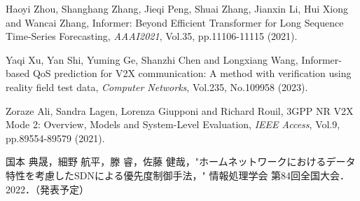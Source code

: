 \documentclass[a4paper,11pt,uplatex]{ujreport}
\begin{document}
\begin{thebibliography}{99}
  Haoyi Zhou, Shanghang Zhang, Jieqi Peng, Shuai Zhang, Jianxin Li, Hui Xiong and Wancai Zhang, Informer: Beyond Efficient Transformer for Long Sequence Time-Series Forecasting, \textit{AAAI2021}, Vol.35, pp.11106-11115 (2021).

  Yaqi Xu, Yan Shi, Yuming Ge, Shanzhi Chen and Longxiang Wang, Informer-based QoS prediction for V2X communication: A method with verification using reality field test data, \textit{Computer Networks}, Vol.235, No.109958 (2023).

  Zoraze Ali, Sandra Lagen, Lorenza Giupponi and Richard Rouil, 3GPP NR V2X Mode 2: Overview, Models and System-Level Evaluation, \textit{IEEE Access}, Vol.9, pp.89554-89579 (2021).

\end{thebibliography}

% 
% 

\label{chap:Bibiliography}

\renewcommand{\bibname}{研究業績}

\begin{thebibliography}{99}
  \bibitem{} 国本 典晟，細野 航平，滕 睿，佐藤 健哉，"ホームネットワークにおけるデータ特性を考慮したSDNによる優先度制御手法，" 情報処理学会 第84回全国大会．2022．（発表予定）
\end{thebibliography}

\label{chap:Publications}

\end{document}
